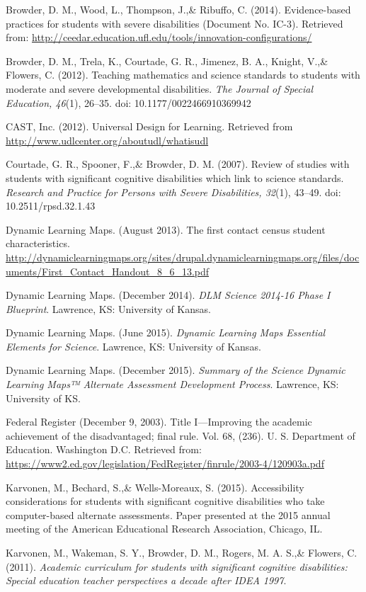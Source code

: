 \documentclass[11.5pt]{sig-alternate} %
\begin{document}
Browder, D. M., Wood, L., Thompson, J.,\& Ribuffo, C. (2014). Evidence-based practices for students with severe disabilities (Document No. IC-3). Retrieved from: \url{http://ceedar.education.ufl.edu/tools/innovation-configurations/}

Browder, D. M., Trela, K., Courtade, G. R., Jimenez, B. A., Knight, V.,\& Flowers, C. (2012). Teaching mathematics and science standards to students with moderate and severe developmental disabilities. \textit{The Journal of Special Education, 46}(1), 26–35. doi: 10.1177/0022466910369942

CAST, Inc. (2012). Universal Design for Learning. Retrieved from \url{http://www.udlcenter.org/aboutudl/whatisudl}

Courtade, G. R., Spooner, F.,\& Browder, D. M. (2007). Review of studies with students with significant cognitive disabilities which link to science standards. \textit{Research and Practice for Persons with Severe Disabilities, 32}(1), 43–49. doi: 10.2511/rpsd.32.1.43

Dynamic Learning Maps. (August 2013). The first contact census student characteristics. \url{http://dynamiclearningmaps.org/sites/drupal.dynamiclearningmaps.org/files/documents/First_Contact_Handout_8_6_13.pdf}

Dynamic Learning Maps. (December 2014). \textit{DLM Science 2014-16 Phase I Blueprint}. Lawrence, KS: University of Kansas. 

Dynamic Learning Maps. (June 2015). \textit{Dynamic Learning Maps Essential Elements for Science}. Lawrence, KS: University of Kansas. 

Dynamic Learning Maps. (December 2015). \textit{Summary of the Science Dynamic Learning Maps™ Alternate Assessment Development Process}. Lawrence, KS: University of KS.

Federal Register (December 9, 2003). Title I—Improving the academic achievement of the disadvantaged; final rule. Vol. 68, (236). U. S. Department of Education. Washington D.C. Retrieved from: \url{https://www2.ed.gov/legislation/FedRegister/finrule/2003-4/120903a.pdf}

Karvonen, M., Bechard, S.,\& Wells-Moreaux, S. (2015). Accessibility considerations for students with significant cognitive disabilities who take computer-based alternate assessments. Paper presented at the 2015 annual meeting of the American Educational Research Association, Chicago, IL.

Karvonen, M., Wakeman, S. Y., Browder, D. M., Rogers, M. A. S.,\& Flowers, C. (2011). \textit{Academic curriculum for students with significant cognitive disabilities: Special education teacher perspectives a decade after IDEA 1997}.
\end{document}
